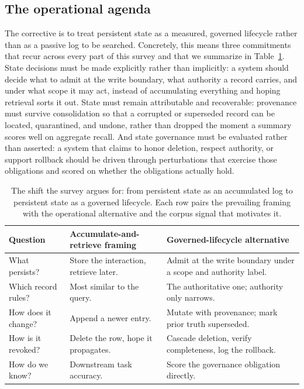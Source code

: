 \subsection{The operational agenda}

The corrective is to treat persistent state as a measured, governed lifecycle rather than as a passive log to be searched. Concretely, this means three commitments that recur across every part of this survey and that we summarize in Table~\ref{tab:conclusion-shift}. State decisions must be made explicitly rather than implicitly: a system should decide what to admit at the write boundary, what authority a record carries, and under what scope it may act, instead of accumulating everything and hoping retrieval sorts it out. State must remain attributable and recoverable: provenance must survive consolidation so that a corrupted or superseded record can be located, quarantined, and undone, rather than dropped the moment a summary scores well on aggregate recall. And state governance must be evaluated rather than asserted: a system that claims to honor deletion, respect authority, or support rollback should be driven through perturbations that exercise those obligations and scored on whether the obligations actually hold.

\begin{table}[t]
\centering
\caption{The shift the survey argues for: from persistent state as an accumulated log to persistent state as a governed lifecycle. Each row pairs the prevailing framing with the operational alternative and the corpus signal that motivates it.}
\label{tab:conclusion-shift}
\small
\begin{tabular}{@{}p{}p{}p{}@{}}
\toprule
\textbf{Question} & \textbf{Accumulate-and-retrieve framing} & \textbf{Governed-lifecycle alternative} \\
\midrule
What persists? & Store the interaction, retrieve later. & Admit at the write boundary under a scope and authority label. \\
Which record rules? & Most similar to the query. & The authoritative one; authority only narrows. \\
How does it change? & Append a newer entry. & Mutate with provenance; mark prior truth superseded. \\
How is it revoked? & Delete the row, hope it propagates. & Cascade deletion, verify completeness, log the rollback. \\
How do we know? & Downstream task accuracy. & Score the governance obligation directly. \\
\bottomrule
\end{tabular}
\end{table}

